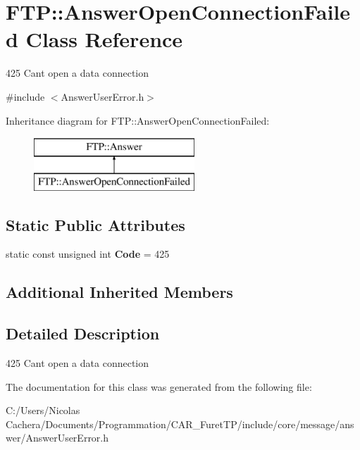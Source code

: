 \hypertarget{classFTP_1_1AnswerOpenConnectionFailed}{}\section{F\+T\+P\+:\+:Answer\+Open\+Connection\+Failed Class Reference}
\label{classFTP_1_1AnswerOpenConnectionFailed}


425 Can\textquotesingle{}t open a data connection  




{\ttfamily \#include $<$Answer\+User\+Error.\+h$>$}

Inheritance diagram for F\+T\+P\+:\+:Answer\+Open\+Connection\+Failed\+:\begin{figure}[H]
\begin{center}
\leavevmode
\includegraphics[height=2.000000cm]{classFTP_1_1AnswerOpenConnectionFailed}
\end{center}
\end{figure}
\subsection*{Static Public Attributes}
\begin{DoxyCompactItemize}
\item 
\hypertarget{classFTP_1_1AnswerOpenConnectionFailed_ab58e3bd133a6b97fcf460bd0ea4550d7}{}static const unsigned int {\bfseries Code} = 425\label{classFTP_1_1AnswerOpenConnectionFailed_ab58e3bd133a6b97fcf460bd0ea4550d7}

\end{DoxyCompactItemize}
\subsection*{Additional Inherited Members}


\subsection{Detailed Description}
425 Can\textquotesingle{}t open a data connection 

The documentation for this class was generated from the following file\+:\begin{DoxyCompactItemize}
\item 
C\+:/\+Users/\+Nicolas Cachera/\+Documents/\+Programmation/\+C\+A\+R\+\_\+\+Furet\+T\+P/include/core/message/answer/Answer\+User\+Error.\+h\end{DoxyCompactItemize}
